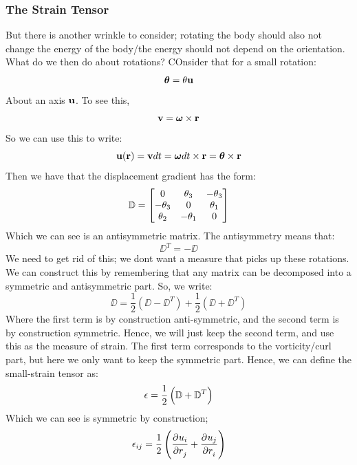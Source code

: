 \documentclass[../PHYS306Notes.tex]{subfiles}
\begin{document}
\subsubsection{The Strain Tensor}
But there is another wrinkle to consider; rotating the body should also not change the energy of the body/the energy should not depend on the orientation. What do we then do about rotations?
COnsider that for a small rotation:
\[\bm{\theta} = \theta\mathbf{u}\]
About an axis $\mathbf{u}$. To see this, 
\[\mathbf{v} = \bm{\omega} \times \mathbf{r}\]
So we can use this to write:
\[\mathbf{u}(\mathbf{r}) = \mathbf{v}dt = \bm{\omega} dt \times \mathbf{r} = \bm{\theta} \times \mathbf{r}\]
Then we have that the displacement gradient has the form:
\[\mathbb{D} = \begin{bmatrix}0 & \theta_3 & -\theta_3 \\ -\theta_3 & 0 & \theta_1 \\ \theta_2 & -\theta_1 & 0\end{bmatrix}\]
Which we can see is an antisymmetric matrix. The antisymmetry means that:
\[\DD^T = -\DD\]
We need to get rid of this; we dont want a measure that picks up these rotations. We can construct this by remembering that any matrix can be decomposed into a symmetric and antisymmetric part. So, we write:
\[\DD = \frac{1}{2}(\DD - \DD^T) + \frac{1}{2}(\DD + \DD^T)\]
Where the first term is by construction anti-symmetric, and the second term is by construction symmetric. Hence, we will just keep the second term, and use this as the measure of strain. The first term corresponds to the vorticity/curl part, but here we only want to keep the symmetric part. Hence, we can define the small-strain tensor as:
\[\epsilon = \frac{1}{2}\left(\mathbb{D} + \mathbb{D}^T\right)\]
Which we can see is symmetric by construction;
\[\e_{ij} = \frac{1}{2}\left(\dpd{u_i}{r_j} + \dpd{u_j}{r_i}\right)\]
\end{document}
